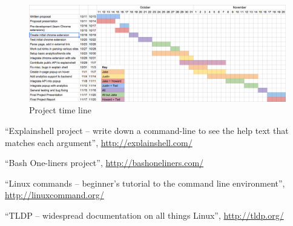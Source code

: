 \documentclass[11pt]{article}
\begin{document}
\begin{landscape}
\thispagestyle{empty}
\begin{figure}[htb]
\vspace*{5em}
\hspace*{-3em}
\centering
\includegraphics[width=1.5\textwidth]{gantt-chart.png}
\caption{Project time line\label{fig:timetable}}
\end{figure}
\end{landscape}

\begin{thebibliography}{9}

  ``Explainshell project -- write down a command-line to see the help text that 
  matches each argument'',
  \url{http://explainshell.com/}

  ``Bash One-liners project'',
  \url{http://bashoneliners.com/}

  ``Linux commands -- beginner's tutorial to the command line environment'',
  \url{http://linuxcommand.org/}

  ``TLDP -- widespread documentation on all things Linux'',
  \url{http://tldp.org/}

\end{thebibliography}
\end{document}
